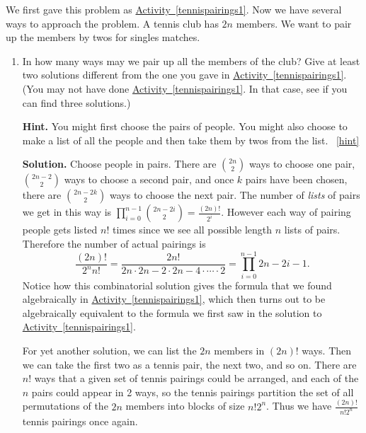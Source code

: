 \documentclass{book}
\begin{document}
\setcounter{project}{112}
\addtocounter{project}{-1}
\begin{activity}[]\label{tennispairings2}
\hypertarget{p-798}{}%
We first gave this problem as \hyperref[tennispairings1]{Activity~\ref{tennispairings1}}. Now we have several ways to approach the problem. A tennis club has \(2n\) members. We want to pair up the members by twos for singles matches.%
\begin{enumerate}[font=\bfseries,label=(\alph*),ref=\alph*]
\item\label{task-148} \hypertarget{p-799}{}%
In how many ways may we pair up all the members of the club? Give at least two solutions different from the one you gave in   \hyperref[tennispairings1]{Activity~\ref{tennispairings1}}. (You may not have done \hyperref[tennispairings1]{Activity~\ref{tennispairings1}}. In that case, see if you can find three solutions.)%
\par\smallskip%
\noindent\textbf{Hint.}\hypertarget{hint-67}{}\quad%
\hypertarget{p-800}{}%
You might first choose the pairs of people. You might also choose to make a list of all the people and then take them by twos from the list.%
~\hfill{\tiny\hyperlink{a-112.a}{[hint]}\hypertarget{q-112.a}{}}\par\smallskip%
\noindent\textbf{Solution.}\hypertarget{solution-75}{}\quad%
\hypertarget{p-801}{}%
Choose people in pairs. There are \(\binom{2n}{2}\) ways to choose one pair, \(\binom{2n-2}{2}\) ways to choose a second pair, and once \(k\) pairs have been chosen, there are \(\binom{2n-2k}{2}\) ways to choose the next pair. The number of \emph{lists} of pairs we get in this way is \(\prod_{i=0}^{n-1} \binom{2n-2i}{2}= \frac{(2n)!}{2^i}\). However each way of pairing people gets listed \(n!\) times since we see all possible length \(n\) lists of pairs. Therefore the number of actual pairings is%
\begin{equation*}
\frac{(2n)!}{2^n n!} = \frac{2n!}{2n\cdot2n-2\cdot2n-4\cdot \cdots\cdot 2} =  \prod_{i=0}^{n-1} 2n-2i-1.
\end{equation*}
Notice how this combinatorial solution gives the formula that we found algebraically in \hyperref[tennispairings1]{Activity~\ref{tennispairings1}}, which then turns out to be algebraically equivalent to the formula we first saw in the solution to \hyperref[tennispairings1]{Activity~\ref{tennispairings1}}.%
\par
\hypertarget{p-802}{}%
For yet another solution, we can list the \(2n\) members in \((2n)!\) ways. Then we can take the first two as a tennis pair, the next two, and so on. There are \(n!\) ways that a given set of tennis pairings could be arranged, and each of the \(n\) pairs could appear in 2 ways, so the tennis pairings partition the set of all permutations of the \(2n\) members into blocks of size \(n!2^n\). Thus we have \(\frac{(2n)!}{n!2^n}\) tennis pairings once again.%

\end{enumerate}
\end{activity}
\end{document}
